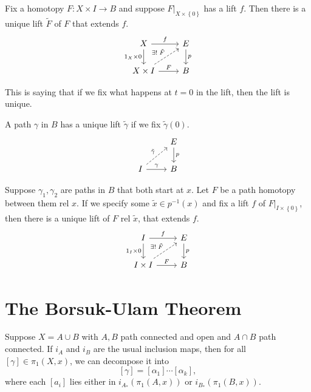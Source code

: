 \documentclass[twoside,10pt]{report}
\begin{document}
\begin{thrm}
	Fix a homotopy $F:X \times I\to B$ and suppose $F|_{X \times \left\{ 0 \right\}}$ has a lift $f$. Then there is a unique lift $\tilde{F}$ of $F$ that extends $f$.
\[
\begin{tikzcd}
	X\rar{f}\arrow[d,"1_{X}\times 0"']&E\dar{p}\\
	X\times I\rar{F}\arrow[ur,dashed,"\exists ! \; \tilde{F}"]&B
\end{tikzcd}
\] 
\end{thrm}
This is saying that if we fix what happens at $t=0$ in the lift, then the lift is unique.

\begin{cor}
	A path $\gamma$ in $B$ has a unique lift $\tilde{\gamma}$ if we fix $\tilde{\gamma}(0)$.
	\[
	\begin{tikzcd}
		&E\dar{p}\\
		I\arrow[ur,dashed,"\tilde{\gamma}"]\rar{\gamma}&B
	\end{tikzcd}
	\] 
\end{cor}

\begin{cor}
	Suppose $\gamma_1,\gamma_2$ are paths in $B$ that both start at $x$. Let $F$ be a path homotopy between them rel $x$. If we specify some $\tilde{x} \in p^{-1}(x)$ and fix a lift $f$ of $F|_{I \times \left\{ 0 \right\}}$, then there is a unique lift of $F$ rel $\tilde{x}$, that extends $f$.
	\[
	\begin{tikzcd}
		I\arrow[d,"1_{I}\times 0"']\rar{f}&E\dar{p}\\
		I\times I\rar{F}\arrow[ur,dashed,"\exists ! \; \tilde{F}"]&B
	\end{tikzcd}
	\] 
\end{cor}


\section{The Borsuk-Ulam Theorem}

\begin{thrm}[]
	Suppose $X=A \cup B$ with $A,B$ path connected and open and $A \cap B$ path connected. If $i_{A}$ and $i_{B}$ are the usual inclusion maps, then for all $[\gamma] \in \pi_1(X,x)$, we can decompose it into
	\[
		[\gamma] = [\alpha_1] \cdots [\alpha_{k}],
	\] where each $[a_i]$ lies either in $i_{A_*}(\pi_1(A,x))$ or $i_{B_{*}}(\pi_1(B,x))$.
\end{thrm}
\end{document}
